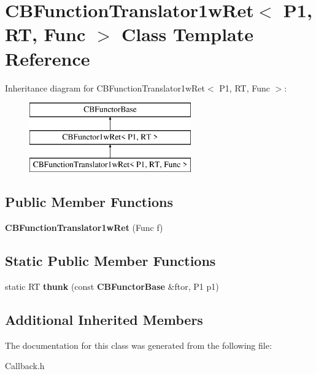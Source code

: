 \section{C\+B\+Function\+Translator1w\+Ret$<$ P1, RT, Func $>$ Class Template Reference}
\label{classCBFunctionTranslator1wRet}
Inheritance diagram for C\+B\+Function\+Translator1w\+Ret$<$ P1, RT, Func $>$\+:\begin{figure}[H]
\begin{center}
\leavevmode
\includegraphics[height=3.000000cm]{classCBFunctionTranslator1wRet}
\end{center}
\end{figure}
\subsection*{Public Member Functions}
\begin{DoxyCompactItemize}
\item 
{\bfseries C\+B\+Function\+Translator1w\+Ret} (Func f)\label{classCBFunctionTranslator1wRet_aed1a0b2082a3dae5dfeaf467f2cf20dd}

\end{DoxyCompactItemize}
\subsection*{Static Public Member Functions}
\begin{DoxyCompactItemize}
\item 
static RT {\bfseries thunk} (const {\bf C\+B\+Functor\+Base} \&ftor, P1 p1)\label{classCBFunctionTranslator1wRet_a8a5d692b29dd3c76b1ea623c2e3c62a7}

\end{DoxyCompactItemize}
\subsection*{Additional Inherited Members}


The documentation for this class was generated from the following file\+:\begin{DoxyCompactItemize}
\item 
Callback.\+h\end{DoxyCompactItemize}
